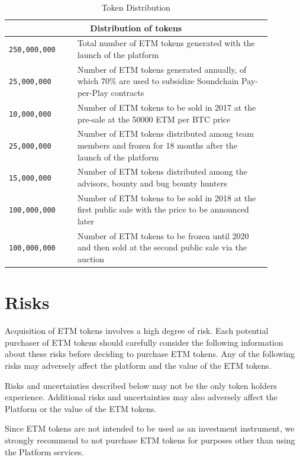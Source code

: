 \documentclass[12pt]{report}
\begin{document}
\begin{table}[H]
\centering
\caption{Token Distribution}
\vspace{20pt}
\begin{tabular}{p{0.23\linewidth}p{0.65\linewidth}}
\toprule
\multicolumn{2}{c}{Distribution of tokens} \\
\bottomrule
\midrule
\texttt{250,000,000} & 
Total number of ETM tokens generated with
 the launch of the platform \\
\midrule
\texttt{25,000,000} & 
Number of ETM tokens generated annually, of which 70\% are used to subsidize Soundchain Pay-per-Play contracts \\
\midrule
\texttt{10,000,000} &
Number of ETM tokens to be sold in 2017 at the pre-sale at the 50000 ETM per BTC price \\
\midrule
\texttt{25,000,000} & 
Number of ETM tokens distributed among team members and frozen for 18 months after the launch of the platform \\
\midrule
\texttt{15,000,000} &
Number of ETM tokens distributed among the advisors, bounty and bug bounty hunters \\
\midrule
\texttt{100,000,000} &
Number of ETM tokens to be sold in 2018 at the first public sale with the price to be announced later \\
\midrule
\texttt{100,000,000} &
Number of ETM tokens to be frozen until 2020 and then sold at the second public sale via the auction \\
\bottomrule
\end{tabular}
\end{table}


\chapter{Risks}
\label{risks}

Acquisition of ETM tokens involves a high degree of risk. Each potential purchaser of ETM tokens should carefully consider the following information about these risks before deciding to purchase ETM tokens. Any of the following risks may adversely affect the platform and the value of the ETM tokens.

Risks and uncertainties described below may not be the only token holders experience. Additional risks and uncertainties may also adversely affect the Platform or the value of the ETM tokens.

Since ETM tokens are not intended to be used as an investment instrument, we strongly recommend to not purchase ETM tokens for purposes other than using the Platform services. 
\end{document}
